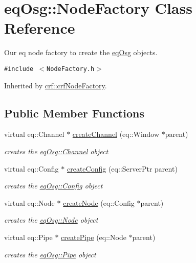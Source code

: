 \hypertarget{a00013}{
\section{eqOsg::NodeFactory Class Reference}
\label{a00013}
}
Our eq node factory to create the \hyperlink{a00045}{eqOsg} objects.  


{\tt \#include $<$NodeFactory.h$>$}

Inherited by \hyperlink{a00005}{crf::crfNodeFactory}.

\subsection*{Public Member Functions}
\begin{CompactItemize}
\item 
virtual eq::Channel $\ast$ \hyperlink{a00013_9cd8a51ad40a04fae74c86d20c5ad561}{createChannel} (eq::Window $\ast$parent)
\begin{CompactList}\small\item\em creates the \hyperlink{a00002}{eqOsg::Channel} object \item\end{CompactList}\item 
virtual eq::Config $\ast$ \hyperlink{a00013_0e80614084de6b23a4a2677fc8af7f93}{createConfig} (eq::ServerPtr parent)
\begin{CompactList}\small\item\em creates the \hyperlink{a00003}{eqOsg::Config} object \item\end{CompactList}\item 
virtual eq::Node $\ast$ \hyperlink{a00013_9a411368eca08325cdc5f80ea687f217}{createNode} (eq::Config $\ast$parent)
\begin{CompactList}\small\item\em creates the \hyperlink{a00012}{eqOsg::Node} object \item\end{CompactList}\item 
virtual eq::Pipe $\ast$ \hyperlink{a00013_10e06f5d0d32f146994274682d39e666}{createPipe} (eq::Node $\ast$parent)
\begin{CompactList}\small\item\em creates the \hyperlink{a00014}{eqOsg::Pipe} object \item\end{CompactList}\end{CompactItemize}



